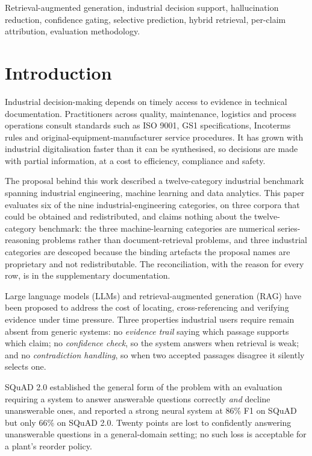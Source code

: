 \documentclass[conference]{IEEEtran}
\begin{document}
\begin{IEEEkeywords}
Retrieval-augmented generation, industrial decision support, hallucination
reduction, confidence gating, selective prediction, hybrid retrieval,
per-claim attribution, evaluation methodology.
\end{IEEEkeywords}

\section{Introduction}

Industrial decision-making depends on timely access to evidence in technical
documentation. Practitioners across quality, maintenance, logistics and
process operations consult standards such as ISO 9001, GS1 specifications,
Incoterms rules and original-equipment-manufacturer service procedures. It
has grown with industrial digitalisation faster than it can be synthesised,
so decisions are made with partial information, at a cost to efficiency,
compliance and safety.

The proposal behind this work described a twelve-category industrial benchmark
spanning industrial engineering, machine learning and data analytics. This
paper evaluates six of the nine industrial-engineering categories, on three
corpora that could be obtained and redistributed, and claims nothing about
the twelve-category benchmark: the three machine-learning categories are
numerical series-reasoning problems rather than document-retrieval problems,
and three industrial categories are descoped because the binding artefacts the
proposal names are proprietary and not redistributable. The reconciliation, with
the reason for every row, is in the supplementary documentation.

Large language models (LLMs) and retrieval-augmented generation (RAG) have
been proposed to address the cost of locating, cross-referencing and
verifying evidence under time pressure. Three properties industrial users
require remain absent from generic systems: no \emph{evidence trail} saying
which passage supports which claim; no \emph{confidence check}, so the system
answers when retrieval is weak; and no \emph{contradiction handling}, so when
two accepted passages disagree it silently selects one.

SQuAD 2.0 established the general form of the problem with an evaluation
requiring a system to answer answerable questions correctly \emph{and}
decline unanswerable ones, and reported a strong neural system at 86\% F1 on
SQuAD but only 66\% on SQuAD 2.0. Twenty points are lost to confidently
answering unanswerable questions in a general-domain setting; no such loss
is acceptable for a plant's reorder policy.
\end{document}

